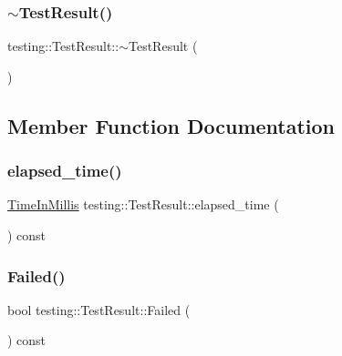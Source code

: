 \mbox{\label{classtesting_1_1_test_result_a41f407680b725b75d7eadc3230bc3315}} 
\subsubsection{\texorpdfstring{$\sim$TestResult()}{~TestResult()}}
{\footnotesize\ttfamily testing\+::\+Test\+Result\+::$\sim$\+Test\+Result (\begin{DoxyParamCaption}{ }\end{DoxyParamCaption})}



\subsection{Member Function Documentation}
\mbox{\label{classtesting_1_1_test_result_a717e05e00d4af5cb809433e343ab63af}} 
\subsubsection{\texorpdfstring{elapsed\_time()}{elapsed\_time()}}
{\footnotesize\ttfamily \mbox{\hyperlink{namespacetesting_a992de1d091ce660f451d1e8b3ce30fd6}{Time\+In\+Millis}} testing\+::\+Test\+Result\+::elapsed\+\_\+time (\begin{DoxyParamCaption}{ }\end{DoxyParamCaption}) const\hspace{0.3cm}{\ttfamily [inline]}}

\mbox{\label{classtesting_1_1_test_result_afacc37e8b43c8574e4101bc61723c769}} 
\subsubsection{\texorpdfstring{Failed()}{Failed()}}
{\footnotesize\ttfamily bool testing\+::\+Test\+Result\+::\+Failed (\begin{DoxyParamCaption}{ }\end{DoxyParamCaption}) const}

